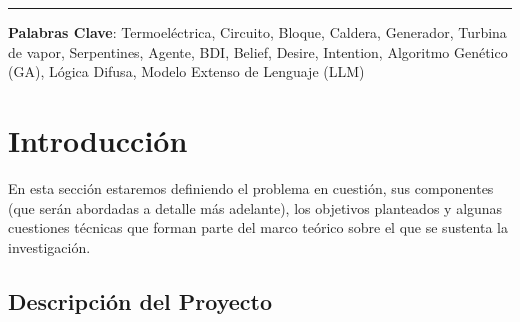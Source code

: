 \documentclass[twocolumn, fontsize=10pt]{article}
\begin{document}
\rule{\linewidth}{0.5pt}

\noindent \textbf{Palabras Clave}: Termoeléctrica, Circuito, Bloque, Caldera, Generador, 
Turbina de vapor, Serpentines, Agente, BDI, Belief, Desire, Intention, Algoritmo Genético (GA), 
Lógica Difusa, Modelo Extenso de Lenguaje (LLM)




\tableofcontents

\section{Introducción}

En esta sección estaremos definiendo el problema en cuestión, 
sus componentes (que serán abordadas a detalle más adelante),
los objetivos planteados y algunas cuestiones técnicas que
forman parte del marco teórico sobre el que se sustenta la investigación.

\subsection{Descripción del Proyecto}
\end{document}
